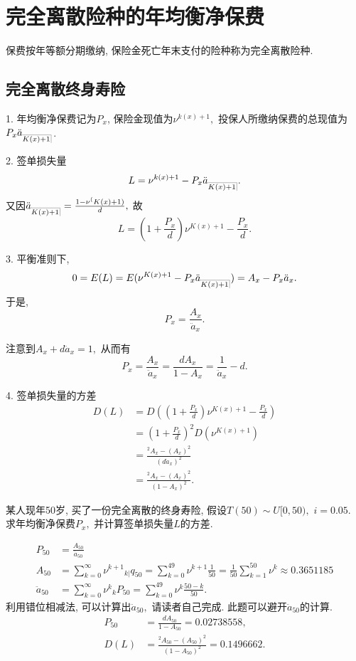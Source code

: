 \documentclass[lang=cn,10pt]{elegantbook}
\makeatletter
\DeclareRobustCommand{\annu}[1]{_{%
    \def\arraystretch{0}%
    \setlength\arraycolsep{1pt}%
    \setlength\arrayrulewidth{.2pt}%
    \begin{array}[b]{@{}c|}\hline
        \\[\arraycolsep]%
        \scriptstyle #1%
    \end{array}%
}}
\makeatother
\begin{document}
\section{完全离散险种的年均衡净保费}
\begin{definition}
    保费按年等额分期缴纳, 保险金死亡年末支付的险种称为完全离散险种.
\end{definition}

\subsection{完全离散终身寿险}
\begin{proposition}
    1. 年均衡净保费记为$P_{x}$, 保险金现值为$\nu^{k(x)+1},$
投保人所缴纳保费的总现值为$P_{x}\ddot{a}_{\annu{K(x)+1}}$.

2. 签单损失量
$$L=\nu^{k(x)+1}-P_{x}\ddot{a}_{\annu{K(x)+1}}.$$
又因$\ddot{a}_{\annu{K(x)+1}}=\frac{1-\nu^(K(x)+1)}{d},$ 故
$$L = (1+\frac{P_{x}}{d})\nu^{K(x)+1}-\frac{P_{x}}{d}.$$

3. 平衡准则下, $$0=E(L)=E(\nu^{K(x)+1}-P_{x}\ddot{a}_{\annu{K(x)+1}})=A_{x}-P_{x}\ddot{a}_{x}. $$
于是,
$$P_{x}=\frac{A_{x}}{\ddot{a}_{x}}.$$

注意到$A_{x}+d\ddot{a}_{x}=1,$ 从而有$$P_{x}=\frac{A_{x}}{\ddot{a}_{x}}=\frac{dA_{x}}{1-A_{x}}=\frac{1}{\ddot{a}_{x}}-d.$$

4. 签单损失量的方差
\begin{align*}
D(L) &= D((1+\frac{P_{x}}{d})\nu^{K(x)+1}-\frac{P_{x}}{d})\\
&= (1+\frac{P_{x}}{d})^{2}D(\nu^{K(x)+1})\\
&= \frac{{}^{2}A_{x}-(A_{x})^{2}}{(d\ddot{a}_{x})^{2}}\\
&= \frac{{}^{2}A_{x}-(A_{x})^{2}}{(1-A_{x})^{2}}.
\end{align*}
\end{proposition}

\begin{example}
    某人现年50岁, 买了一份完全离散的终身寿险, 假设$T(50)\sim U[0,50),$ $i=0.05.$ 求年均衡净保费$P_{x},$ 并计算签单损失量$L$的方差.
 \end{example}
 \begin{solution}
 \begin{align*}
 P_{50}&=\frac{A_{50}}{\ddot{a}_{50}}\\
 A_{50}&=\sum^{\infty}_{k=0}\nu^{k+1}{}_{k|}q_{50}=\sum^{49}_{k=0}\nu^{k+1}\frac{1}{50}=\frac{1}{50}\sum^{50}_{k=1}\nu^{k}
 \approx 0.3651185\\
 \ddot{a}_{50}&=\sum^{\infty}_{k=0}\nu^{k}{}_{k}P_{50}=\sum^{49}_{k=0}\nu^{k}\frac{50-k}{50}.
 \end{align*}
 利用错位相减法, 可以计算出$\ddot{a}_{50},$  请读者自己完成. 此题可以避开$\ddot{a}_{50}$的计算.
 \begin{align*}
 P_{50}&=\frac{dA_{50}}{1-A_{50}}=0.02738558,\\
 D(L)&=\frac{^{2}A_{50}-(A_{50})^{2}}{(1-A_{50})^2}= 0.1496662.
 \end{align*}
\end{solution}
\end{document}
